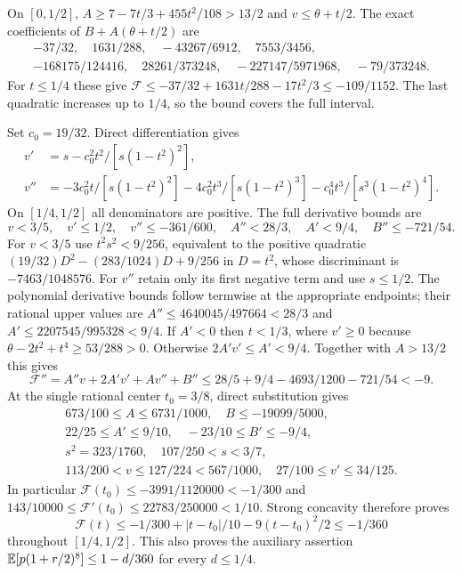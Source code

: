 On $[0,1/2]$, $A\ge7-7t/3+455t^2/108>13/2$ and
$v\le\theta+t/2$.
The exact coefficients of $B+A(\theta+t/2)$ are
\begin{gather*}
 -37/32,\quad1631/288,\quad-43267/6912,\quad7553/3456,\\
 -168175/124416,\quad28261/373248,\quad-227147/5971968,\quad-79/373248.
\end{gather*}
For $t\le1/4$ these give
$\mathcal F\le-37/32+1631t/288-17t^2/3\le-109/1152$.
The last quadratic increases up to $1/4$, so the bound covers the full interval.

Set $c_0=19/32$. Direct differentiation gives
\begin{align*}
 v'&=s-c_0^2t^2/[s(1-t^2)^2],\\
 v''&=-3c_0^2t/[s(1-t^2)^2]-4c_0^2t^3/[s(1-t^2)^3]
                         -c_0^4t^3/[s^3(1-t^2)^4].
\end{align*}
On $[1/4,1/2]$ all denominators are positive. The full derivative bounds are
\[
 v<3/5,\quad v'\le1/2,\quad v''\le-361/600,\quad
 A''<28/3,\quad A'<9/4,\quad B''\le-721/54.
\]
For $v<3/5$ use $t^2s^2<9/256$, equivalent to the positive quadratic
$(19/32)D^2-(283/1024)D+9/256$ in $D=t^2$,
whose discriminant is $-7463/1048576$.
For $v''$ retain only its first negative term and use $s\le1/2$.
The polynomial derivative bounds follow termwise at the appropriate
endpoints; their rational upper values are
$A''\le4640045/497664<28/3$ and $A'\le2207545/995328<9/4$.
If $A'<0$ then $t<1/3$, where $v'\ge0$ because
$\theta-2t^2+t^4\ge53/288>0$.
Otherwise $2A'v'\le A'<9/4$.
Together with $A>13/2$ this gives
\[
 \mathcal F''=A''v+2A'v'+Av''+B''
 \le28/5+9/4-4693/1200-721/54<-9.
\]
At the single rational center $t_0=3/8$, direct substitution gives
\begin{gather*}
 673/100\le A\le6731/1000,\quad B\le-19099/5000,\\
 22/25\le A'\le9/10,\quad-23/10\le B'\le-9/4,\\
 s^2=323/1760,\quad107/250<s<3/7,\\
 113/200<v\le127/224<567/1000,\quad27/100\le v'\le34/125.
\end{gather*}
In particular $\mathcal F(t_0)\le-3991/1120000<-1/300$ and
$143/10000\le\mathcal F'(t_0)\le22783/250000<1/10$.
Strong concavity therefore proves
\[
 \mathcal F(t)\le-1/300+|t-t_0|/10-9(t-t_0)^2/2\le-1/360
\]
throughout $[1/4,1/2]$.
This also proves the auxiliary assertion
$\mathbb E[p(1+r/2)^8]\le1-d/360$ for every $d\le1/4$.

